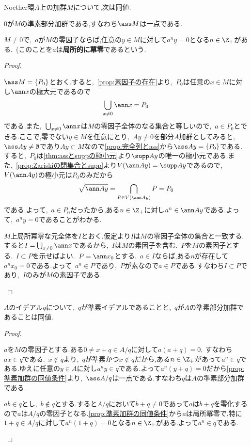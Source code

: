 \begin{prop}\label{prop:準素加群の同値条件}
	Noether環$A$上の加群$M$について,次は同値.
	\begin{sakura}
		\item 0が$M$の準素部分加群である,すなわち$\ass M$は一点である.
		\item $M\neq0$で,~$a$が$M$の零因子ならば,任意の$y\in M$に対して$a^ny=0$となる$n\in\Z_+$がある.~(このことを$a$は\textbf{局所的に冪零}であるという.
	\end{sakura}
\end{prop}
\begin{proof}
	\begin{eqv}
		\item $\ass M=\{ P_0\}$とおく.すると,~\ref{prop:素因子の存在}より,~$ P_0$は任意の$x\in M$に対し$\ann x$の極大元であるので
		\[\bigcup_{x\neq0}\ann x= P_0\]である.また,~$\bigcup_{x\neq0}\ann x$は$M$の零因子全体のなる集合と等しいので,~$a\in P_0$とできる.ここで,零でない$y\in M$を任意にとり,~$Ay\neq0$を部分$A$加群としてみると,~$\ass Ay\neq\emptyset$であり$Ay\subset M$なので\ref{prop:完全列とass}から$\ass Ay=\{ P_0\}$である.すると,~$ P_0$は\ref{thm:assとsuppの極小元}より$\supp Ay$の唯一の極小元である.また,~\ref{prop:Zariskiの閉集合とsupp}より$V(\ann Ay)=\supp Ay$であるので,~$V(\ann Ay)$の極小元は$ P_0$のみだから
		\[\sqrt{\ann Ay}=\bigcap_{ P\in V(\ann Ay)} P= P_0\]
		である.よって,~$a\in P_0$だったから,ある$n\in\Z_+$に対し$a^n\in\ann Ay$である.よって,~$a^n y=0$であることがわかる.
		\item $M$上局所冪零な元全体を$I$とおく.仮定より$I$は$M$の零因子全体の集合と一致する.すると$I=\bigcup_{x\neq0}\ann x$であるから,~$I$は$M$の素因子を含む.~$ P$を$M$の素因子とする.~$I\subset  P$を示せばよい.~$ P=\ann x_0$とする.~$a\in I$ならば,ある$n$が存在して$a^nx_0=0$である.よって~$a^n\in P$であり,~$ P$が素なので$a\in P$である.すなわち$I\subset P$であり,~$I$のみが$M$の素因子である.
	\end{eqv}
\end{proof}
\begin{cor}\label{cor:準素イデアルと準素加群の整合性}
	$A$のイデアル$ q$について,~$q$が準素イデアルであることと,~$q$が$A$の準素部分加群であることは同値.
\end{cor}
\begin{proof}
	\begin{eqv}
		\item $a$を$M$の零因子とする.ある$0\neq x+ q\in A/ q$に対して$a(a+ q)=0,~$すなわち$ax\in q$である.~$x\not\in q$より,~$ q$が準素かつ$x\not\in q$だから,ある$n\in\Z_+$があって$a^n\in q$である.ゆえに任意の$y\in A$に対し$a^n y\in q$である.よって$a^n(y+ q)=0$だから\ref{prop:準素加群の同値条件}より,~$\ass A/ q$は一点である.すなわち$ q$は$A$の準素部分加群である.
		\item $ab\in q$とし,~$b\not\in q$とする.すると$A/ q$において$b+ q\neq0$であって$a$は$b+ q$を零化するので$a$は$A/ q$の零因子となる.\ref{prop:準素加群の同値条件}から$a$は局所冪零で,特に$1+ q\in A/ q$に対して$a^n(1+ q)=0$となる$n\in\Z_+$がある.よって$a^n\in q$である.
	\end{eqv}
\end{proof}

